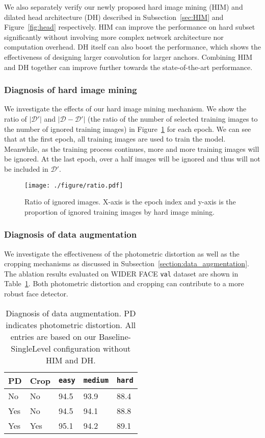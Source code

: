 \documentclass[10pt,twocolumn,letterpaper]{article}
\begin{document}
We also separately verify our newly proposed hard image mining (HIM) and dilated head architecture (DH) described in Subsection~\ref{sec:HIM} and Figure~\ref{fig:head}
respectively.
HIM can improve the performance on hard subset significantly without involving more complex network
architecture nor computation overhead. DH itself can also boost the performance, which
shows the effectiveness of designing larger convolution for larger anchors.
Combining HIM and DH together can improve further towards the state-of-the-art performance.
\subsubsection*{Diagnosis of hard image mining}
We investigate the effects of our hard image mining mechanism. We show the ratio of $|\mathcal{D}'|$ and $|\mathcal{D}-\mathcal{D}'|$ (\ie the ratio of the number of selected training images to
the number of ignored training images) in Figure~\ref{fig:ratio} for each
epoch. We can see that at the
first epoch, all training images are used to train the model. Meanwhile, as the training process continues, more and more training images will be ignored. At the last epoch, over a half images will be ignored and thus will not be included in $\mathcal{D}'$.
\begin{figure}[!tb]
\texttt{[image: ./figure/ratio.pdf]}
\caption{Ratio of ignored images. X-axis is the epoch index and y-axis is the proportion
of ignored training images by hard image mining.}
\label{fig:ratio}
\end{figure}

\subsubsection*{Diagnosis of data augmentation}
We investigate the effectiveness of the photometric distortion
as well as the cropping mechanisms as discussed in
Subsection~\ref{section:data_augmentation}. The ablation results evaluated on WIDER
FACE \texttt{val} dataset are shown in
Table~\ref{tbl:da}. Both photometric distortion and cropping can contribute to a more
robust face detector.
\begin{table}[ht]
\centering
\begin{tabular}{|l|l|l|l|l|}
\hline
PD & Crop & \texttt{easy} & \texttt{medium} & \texttt{hard} \\ \hline
No  & No    & 94.5 & 93.9   & 88.4 \\ \hline
Yes  & No    & 94.5 & 94.1   & 88.8 \\ \hline
Yes  & Yes    & 95.1 & 94.2   & 89.1 \\ \hline
\end{tabular}
\caption{Diagnosis of data augmentation. PD indicates photometric distortion.
All entries are based on our Baseline-SingleLevel configuration without
HIM and DH.}\label{tbl:da}
\end{table}
\end{document}

